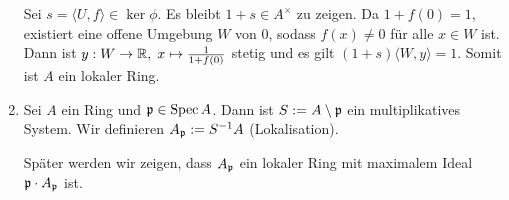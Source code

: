 \documentclass[12pt,a4paper]{scrartcl}
\theoremstyle{cplain}
\theoremstyle{cdef}
\begin{document}
\begin{bsp}
\begin{enumerate}
        Sei $s = \langle U,f \rangle \in \ker \phi$. Es bleibt $1+s \in A^{\times}$ zu zeigen. Da $1+f(0)=1$, existiert eine offene Umgebung $W$ von $0$, sodass $f(x) \neq 0$ für alle $x \in W$ ist. Dann ist $y: W \to \mathbb R, \; x \mapsto \frac{1}{1+f(0)}$ stetig und es gilt $(1+s)\langle W,y \rangle = 1$. Somit ist $A$ ein lokaler Ring.
        
        \item Sei $A$ ein Ring und $\mathfrak{p} \in \operatorname{Spec} A$. Dann ist $S := A \setminus \mathfrak{p}$ ein multiplikatives System. Wir definieren $A_{\mathfrak{p}} := S^{-1}A$ (Lokalisation).
        
        Später werden wir zeigen, dass $A_{\mathfrak{p}}$ ein lokaler Ring mit maximalem Ideal $\mathfrak{p} \cdot A_{\mathfrak{p}}$ ist.
	\end{enumerate}
\end{bsp}

\end{document}
